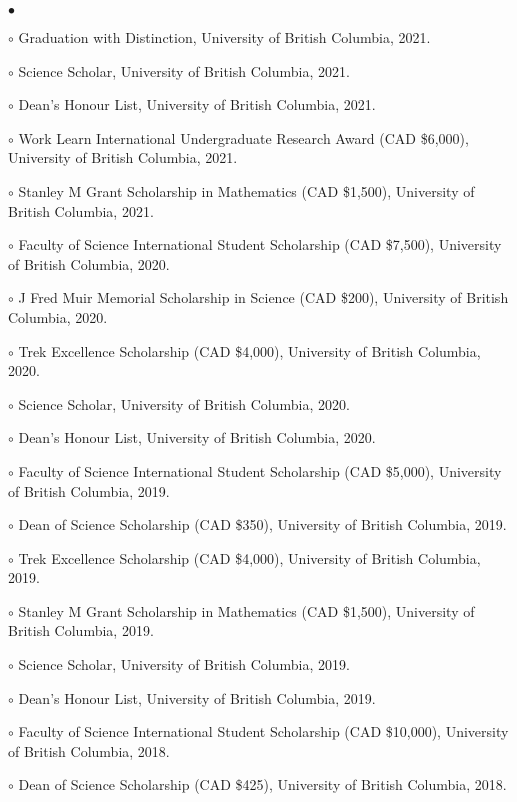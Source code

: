 \documentclass[margin,line]{res}
\newenvironment{list2}{
  \begin{list}{$\bullet$}{%
      \setlength{\itemsep}{0in}
      \setlength{\parsep}{0in} \setlength{\parskip}{0in}
      \setlength{\topsep}{0in} \setlength{\partopsep}{0in}
      \setlength{\leftmargin}{0.2in}}}{\end{list}}
\begin{document}
\begin{resume}
\begin{list2}
\item[$\circ$] Graduation with Distinction, University of British Columbia, 2021.
\item[$\circ$] Science Scholar, University of British Columbia, 2021.
\item[$\circ$] Dean's Honour List, University of British Columbia, 2021.
\item[$\circ$] Work Learn International Undergraduate Research Award (CAD \$6,000), University of British Columbia, 2021.
\item[$\circ$] Stanley M Grant Scholarship in Mathematics (CAD \$1,500), University of British Columbia, 2021.
\item[$\circ$] Faculty of Science International Student Scholarship (CAD \$7,500), University of British Columbia, 2020.
\item[$\circ$] J Fred Muir Memorial Scholarship in Science (CAD \$200), University of British Columbia, 2020.
\item[$\circ$] Trek Excellence Scholarship (CAD \$4,000), University of British Columbia, 2020.
\item[$\circ$] Science Scholar, University of British Columbia, 2020.
\item[$\circ$] Dean's Honour List, University of British Columbia, 2020.
\item[$\circ$] Faculty of Science International Student Scholarship (CAD \$5,000), University of British Columbia, 2019.
\item[$\circ$] Dean of Science Scholarship (CAD \$350), University of British Columbia, 2019.
\item[$\circ$] Trek Excellence Scholarship (CAD \$4,000), University of British Columbia, 2019.
\item[$\circ$] Stanley M Grant Scholarship in Mathematics (CAD \$1,500), University of British Columbia, 2019.
\item[$\circ$] Science Scholar, University of British Columbia, 2019.
\item[$\circ$] Dean's Honour List, University of British Columbia, 2019.
\item[$\circ$] Faculty of Science International Student Scholarship (CAD \$10,000), University of British Columbia, 2018.
\item[$\circ$] Dean of Science Scholarship (CAD \$425), University of British Columbia, 2018.

\end{list2}
\end{resume}
\end{document}
